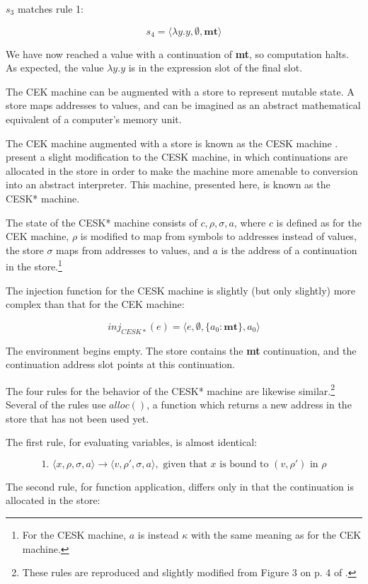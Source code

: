 \documentclass{article}
\begin{document}
$s_3$ matches rule 1:

$$ s_4 = \langle \lambda y.y, \emptyset, \textbf{mt} \rangle $$

We have now reached a value with a continuation of \textbf{mt}, so computation halts. As expected, the value $\lambda y.y$ is in the expression slot of the final slot.

The CEK machine can be augmented with a store to represent mutable state. A store maps addresses to values, and can be imagined as an abstract mathematical equivalent of a computer's memory unit.

The CEK machine augmented with a store is known as the CESK machine \cite{cesk}. \cite{aam} present a slight modification to the CESK machine, in which continuations are allocated in the store in order to make the machine more amenable to conversion into an abstract interpreter. This machine, presented here, is known as the CESK* machine.

The state of the CESK* machine consists of $c, \rho, \sigma, a$, where $c$ is defined as for the CEK machine, $\rho$ is modified to map from symbols to addresses instead of values, the store $\sigma$ maps from addresses to values, and $a$ is the address of a continuation in the store.\footnote{For the CESK machine, $a$ is instead $\kappa$ with the same meaning as for the CEK machine.}

The injection function for the CESK machine is slightly (but only slightly) more complex than that for the CEK machine:

$$ inj_{CESK*}(e) = \langle e, \emptyset, \{ a_0: \textbf{mt} \}, a_0 \rangle $$

The environment begins empty. The store contains the \textbf{mt} continuation, and the continuation address slot points at this continuation.

The four rules for the behavior of the CESK* machine are likewise similar.\footnote{These rules are reproduced and slightly modified from Figure 3 on p. 4 of \cite{aam}.} Several of the rules use $alloc()$, a function which returns a new address in the store that has not been used yet.

The first rule, for evaluating variables, is almost identical:

$$
\text{1. }
\langle x, \rho, \sigma, a \rangle
\to
\langle v, \rho', \sigma, a \rangle,
\text{ given that $x$ is bound to $(v, \rho')$ in $\rho$}
$$

The second rule, for function application, differs only in that the continuation is allocated in the store:
\end{document}
